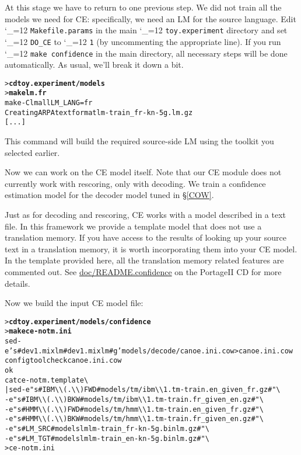 \documentclass[11pt,letterpaper]{article}
\newcommand{\bs}{\textbackslash{}}
\newcommand{\PS}{PortageII\xspace}
\def\code{\begingroup\catcode`\_=12 \codex}
\newcommand{\codex}[1]{\texttt{#1}\endgroup}
\begin{document}
At this stage we have to return to one previous step. We did not train all
the models we need for CE: specifically, we need an LM for the source language.
Edit \code{Makefile.params} in the main \code{toy.experiment} directory and set
\code{DO_CE} to \code{1} (by uncommenting the appropriate line). If you run
\code{make confidence} in the main directory, all necessary steps will be done
automatically.  As usual, we'll break it down a bit.
\begin{small}
\begin{alltt}
   > \textbf{cd toy.experiment/models}
   > \textbf{make lm.fr}
   make -C lm all LM_LANG=fr
   Creating ARPA text format lm-train_fr-kn-5g.lm.gz
   [...]
\end{alltt}
\end{small}
This command will build the required source-side LM using the toolkit you
selected earlier.

Now we can work on the CE model itself. Note that our CE module does not
currently work with rescoring, only with decoding. We train a confidence
estimation model for the decoder model tuned in \S\ref{COW}.

Just as for decoding and rescoring, CE works with a model described in a text
file.  In this framework we provide a template model that does not use a
translation memory.  If you have access to the results of looking up your
source text in a translation memory, it is worth incorporating them into your
CE model.  In the template provided here, all the translation memory related
features are commented out.  See \url{doc/README.confidence} on the \PS CD for
more details.

Now we build the input CE model file:
\begin{small}
\begin{alltt}
   > \textbf{cd toy.experiment/models/confidence}
   > \textbf{make ce-notm.ini}
   sed -e 's#dev1.mixlm#dev1.mixlm#g' models/decode/canoe.ini.cow > canoe.ini.cow
   configtool check canoe.ini.cow
   ok
   cat ce-notm.template \bs
      | sed -e "s#IBM\bs\bs(.\bs\bs)FWD#models/tm/ibm\bs\bs1.tm-train.en_given_fr.gz#" \bs
            -e "s#IBM\bs\bs(.\bs\bs)BKW#models/tm/ibm\bs\bs1.tm-train.fr_given_en.gz#" \bs
            -e "s#HMM\bs\bs(.\bs\bs)FWD#models/tm/hmm\bs\bs1.tm-train.en_given_fr.gz#" \bs
            -e "s#HMM\bs\bs(.\bs\bs)BKW#models/tm/hmm\bs\bs1.tm-train.fr_given_en.gz#" \bs
            -e "s#LM_SRC#models\/lm\/lm-train_fr-kn-5g.binlm.gz#" \bs
            -e "s#LM_TGT#models\/lm\/lm-train_en-kn-5g.binlm.gz#" \bs
      > ce-notm.ini
\end{alltt}
\end{small}
\end{document}
